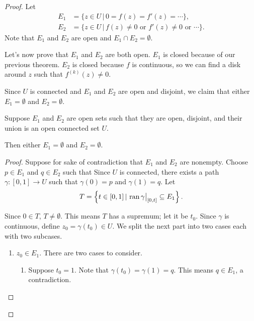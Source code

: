\documentclass[notes]{subfile}
\begin{document}
\begin{proof}
    Let
    \begin{align*}
        E_1 &= \{ z \in U \, | \, 0 = f(z) = f'(z) = \cdots \}, \\
        E_2 &= \{ z \in U \, | \, f(z) \ne 0 \text{\ or\ }
        f'(z) \ne 0 \text{\ or\ } \cdots \}.
    \end{align*}
    Note that $E_1$ and $E_2$ are open and $E_1 \cap E_2 = \emptyset$.

    \noindent
    Let's now prove that $E_1$ and $E_2$ are both open.
    $E_1$ is closed because of our previous theorem.
    $E_2$ is closed because $f$ is continuous, so we can find
    a disk around $z$ such that $f^{(k)}(z) \ne 0$.

    \noindent
    Since $U$ is connected and $E_1$ and $E_2$ are open and disjoint,
    we claim that either $E_1 = \emptyset$ and $E_2 = \emptyset$.

    \begin{lemma}
        Suppose $E_1$ and $E_2$ are open sets such that they are
        open, disjoint, and their union is an open connected
        set $U$.
        
        \noindent
        Then either $E_1 = \emptyset$ and $E_2 = \emptyset$.
    \end{lemma}

    \begin{proof}
        Suppose for sake of contradiction that $E_1$
        and $E_2$ are nonempty.
        Choose $p \in E_1$ and $q \in E_2$ such that
        Since $U$ is connected, there exists a path
        $\gamma : [0,1] \to U$ such that $\gamma(0) = p$
        and $\gamma(1) = q$.
        Let
        \[ T = \left\{ t \in [0,1] \, | \, \operatorname{ran}{\gamma\big|_{[0, t]}} 
            \subseteq E_1 \right\}.
        \]

        Since $0 \in T$, $T \ne \emptyset$.  
        This means $T$ has a supremum; let it be $t_0$.
        Since $\gamma$ is continuous, define $z_0 = \gamma(t_0) \in U$.
        We split the next part into two cases each with two
        subcases.
        \begin{enumerate}
            \item $z_0 \in E_1$.  There are two cases to consider.
                \begin{enumerate}
                    \item Suppose $t_0 = 1$.
                        Note that $\gamma(t_0) = \gamma(1) = q$.
                        This means $q \in E_1$, a contradiction.


\end{enumerate}
\end{enumerate}
\end{proof}
\end{proof}
\end{document}
